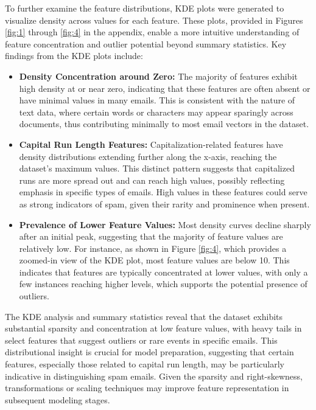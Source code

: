 \documentclass[a4paper,oneside,bibliography=totoc]{scrartcl}
\begin{document}
To further examine the feature distributions, KDE plots were generated to visualize density across values for each feature. These plots, provided in Figures \ref{fig:1} through \ref{fig:4} in the appendix, enable a more intuitive understanding of feature concentration and outlier potential beyond summary statistics. Key findings from the KDE plots include:

\begin{itemize}
    \item \textbf{Density Concentration around Zero:} The majority of features exhibit high density at or near zero, indicating that these features are often absent or have minimal values in many emails. This is consistent with the nature of text data, where certain words or characters may appear sparingly across documents, thus contributing minimally to most email vectors in the dataset.

    \item \textbf{Capital Run Length Features:} Capitalization-related features have density distributions extending further along the x-axis, reaching the dataset’s maximum values. This distinct pattern suggests that capitalized runs are more spread out and can reach high values, possibly reflecting emphasis in specific types of emails. High values in these features could serve as strong indicators of spam, given their rarity and prominence when present.

    \item \textbf{Prevalence of Lower Feature Values:} Most density curves decline sharply after an initial peak, suggesting that the majority of feature values are relatively low. For instance, as shown in Figure \ref{fig:4}, which provides a zoomed-in view of the KDE plot, most feature values are below 10. This indicates that features are typically concentrated at lower values, with only a few instances reaching higher levels, which supports the potential presence of outliers.
\end{itemize}

The KDE analysis and summary statistics reveal that the dataset exhibits substantial sparsity and concentration at low feature values, with heavy tails in select features that suggest outliers or rare events in specific emails. This distributional insight is crucial for model preparation, suggesting that certain features, especially those related to capital run length, may be particularly indicative in distinguishing spam emails. Given the sparsity and right-skewness, transformations or scaling techniques may improve feature representation in subsequent modeling stages.
\end{document}
